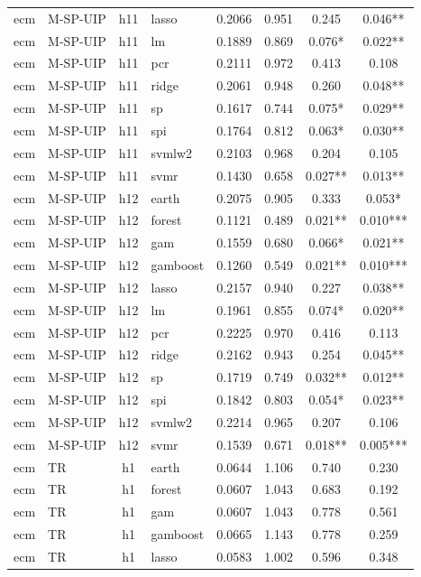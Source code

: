 \begin{ThreePartTable}
\begin{longtable}[t]{llclcccc}
ecm & M-SP-UIP & h11 & lasso & 0.2066 & 0.951 & 0.245 & 0.046**\\
ecm & M-SP-UIP & h11 & lm & 0.1889 & 0.869 & 0.076* & 0.022**\\
ecm & M-SP-UIP & h11 & pcr & 0.2111 & 0.972 & 0.413 & 0.108\\
ecm & M-SP-UIP & h11 & ridge & 0.2061 & 0.948 & 0.260 & 0.048**\\
ecm & M-SP-UIP & h11 & sp & 0.1617 & 0.744 & 0.075* & 0.029**\\
ecm & M-SP-UIP & h11 & spi & 0.1764 & 0.812 & 0.063* & 0.030**\\
ecm & M-SP-UIP & h11 & svmlw2 & 0.2103 & 0.968 & 0.204 & 0.105\\
ecm & M-SP-UIP & h11 & svmr & 0.1430 & 0.658 & 0.027** & 0.013**\\
\addlinespace
ecm & M-SP-UIP & h12 & earth & 0.2075 & 0.905 & 0.333 & 0.053*\\
ecm & M-SP-UIP & h12 & forest & 0.1121 & 0.489 & 0.021** & 0.010***\\
ecm & M-SP-UIP & h12 & gam & 0.1559 & 0.680 & 0.066* & 0.021**\\
ecm & M-SP-UIP & h12 & gamboost & 0.1260 & 0.549 & 0.021** & 0.010***\\
ecm & M-SP-UIP & h12 & lasso & 0.2157 & 0.940 & 0.227 & 0.038**\\
ecm & M-SP-UIP & h12 & lm & 0.1961 & 0.855 & 0.074* & 0.020**\\
ecm & M-SP-UIP & h12 & pcr & 0.2225 & 0.970 & 0.416 & 0.113\\
ecm & M-SP-UIP & h12 & ridge & 0.2162 & 0.943 & 0.254 & 0.045**\\
ecm & M-SP-UIP & h12 & sp & 0.1719 & 0.749 & 0.032** & 0.012**\\
ecm & M-SP-UIP & h12 & spi & 0.1842 & 0.803 & 0.054* & 0.023**\\
ecm & M-SP-UIP & h12 & svmlw2 & 0.2214 & 0.965 & 0.207 & 0.106\\
ecm & M-SP-UIP & h12 & svmr & 0.1539 & 0.671 & 0.018** & 0.005***\\
\addlinespace
ecm & TR & h1 & earth & 0.0644 & 1.106 & 0.740 & 0.230\\
ecm & TR & h1 & forest & 0.0607 & 1.043 & 0.683 & 0.192\\
ecm & TR & h1 & gam & 0.0607 & 1.043 & 0.778 & 0.561\\
ecm & TR & h1 & gamboost & 0.0665 & 1.143 & 0.778 & 0.259\\
ecm & TR & h1 & lasso & 0.0583 & 1.002 & 0.596 & 0.348\\

\end{longtable}
\end{ThreePartTable}
